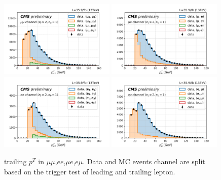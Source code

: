 \begin{figure}[h!]
  \centering
  \includegraphics[width=0.49\textwidth]{chapters/Appendix/sectionTriggerTest/figures/trgLep_mumu.png}
  \includegraphics[width=0.49\textwidth]{chapters/Appendix/sectionTriggerTest/figures/trgLep_emu.png}
  \includegraphics[width=0.49\textwidth]{chapters/Appendix/sectionTriggerTest/figures/trgLep_ee.png}
  \includegraphics[width=0.49\textwidth]{chapters/Appendix/sectionTriggerTest/figures/trgLep_emu2.png}
  \caption{trailing $p^T$ in $\mu\mu$,$ee$,$\mu e$,$e\mu$. Data and MC events channel are split 
  based on the trigger test of leading and trailing lepton. 
  \label{fig:triggerTest}}
\end{figure}
\FloatBarrier